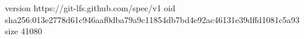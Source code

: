 version https://git-lfs.github.com/spec/v1
oid sha256:013e2778d61c946aaf0dba79a9c11854db7bd4e92ac46131e39dffd1081c5a93
size 41080
